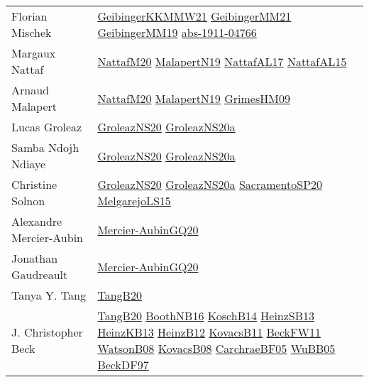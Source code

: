 {\begin{longtable}{p{4cm}p{15cm}}
Florian Mischek & \href{papers/GeibingerKKMMW21.pdf}{GeibingerKKMMW21}\cite{GeibingerKKMMW21} \href{papers/GeibingerMM21.pdf}{GeibingerMM21}\cite{GeibingerMM21} \href{papers/GeibingerMM19.pdf}{GeibingerMM19}\cite{GeibingerMM19} \href{articles/abs-1911-04766.pdf}{abs-1911-04766}\cite{abs-1911-04766} \\
Margaux Nattaf & \href{papers/NattafM20.pdf}{NattafM20}\cite{NattafM20} \href{papers/MalapertN19.pdf}{MalapertN19}\cite{MalapertN19} \href{articles/NattafAL17.pdf}{NattafAL17}\cite{NattafAL17} \href{articles/NattafAL15.pdf}{NattafAL15}\cite{NattafAL15} \\
Arnaud Malapert & \href{papers/NattafM20.pdf}{NattafM20}\cite{NattafM20} \href{papers/MalapertN19.pdf}{MalapertN19}\cite{MalapertN19} \href{papers/GrimesHM09.pdf}{GrimesHM09}\cite{GrimesHM09} \\
Lucas Groleaz & \href{papers/GroleazNS20.pdf}{GroleazNS20}\cite{GroleazNS20} \href{papers/GroleazNS20a.pdf}{GroleazNS20a}\cite{GroleazNS20a} \\
Samba Ndojh Ndiaye & \href{papers/GroleazNS20.pdf}{GroleazNS20}\cite{GroleazNS20} \href{papers/GroleazNS20a.pdf}{GroleazNS20a}\cite{GroleazNS20a} \\
Christine Solnon & \href{papers/GroleazNS20.pdf}{GroleazNS20}\cite{GroleazNS20} \href{papers/GroleazNS20a.pdf}{GroleazNS20a}\cite{GroleazNS20a} \href{articles/SacramentoSP20.pdf}{SacramentoSP20}\cite{SacramentoSP20} \href{papers/MelgarejoLS15.pdf}{MelgarejoLS15}\cite{MelgarejoLS15} \\
Alexandre Mercier{-}Aubin & \href{papers/Mercier-AubinGQ20.pdf}{Mercier-AubinGQ20}\cite{Mercier-AubinGQ20} \\
Jonathan Gaudreault & \href{papers/Mercier-AubinGQ20.pdf}{Mercier-AubinGQ20}\cite{Mercier-AubinGQ20} \\
Tanya Y. Tang & \href{papers/TangB20.pdf}{TangB20}\cite{TangB20} \\
J. Christopher Beck & \href{papers/TangB20.pdf}{TangB20}\cite{TangB20} \href{papers/BoothNB16.pdf}{BoothNB16}\cite{BoothNB16} \href{papers/KoschB14.pdf}{KoschB14}\cite{KoschB14} \href{articles/HeinzSB13.pdf}{HeinzSB13}\cite{HeinzSB13} \href{papers/HeinzKB13.pdf}{HeinzKB13}\cite{HeinzKB13} \href{papers/HeinzB12.pdf}{HeinzB12}\cite{HeinzB12} \href{articles/KovacsB11.pdf}{KovacsB11}\cite{KovacsB11} \href{articles/BeckFW11.pdf}{BeckFW11}\cite{BeckFW11} \href{papers/WatsonB08.pdf}{WatsonB08}\cite{WatsonB08} \href{articles/KovacsB08.pdf}{KovacsB08}\cite{KovacsB08} \href{papers/CarchraeBF05.pdf}{CarchraeBF05}\cite{CarchraeBF05} \href{papers/WuBB05.pdf}{WuBB05}\cite{WuBB05} \href{papers/BeckDF97.pdf}{BeckDF97}\cite{BeckDF97} \\

\end{longtable}}
